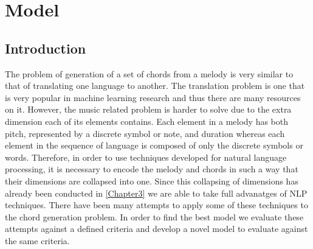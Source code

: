 
\chapter{Model} %

\label{Chapter4} %


\newcommand{\keyword}[1]{\textbf{#1}}
\newcommand{\tabhead}[1]{\textbf{#1}}
\newcommand{\code}[1]{\texttt{#1}}
\newcommand{\file}[1]{\texttt{\bfseries#1}}
\newcommand{\option}[1]{\texttt{\itshape#1}}



\section{Introduction}


The problem of generation of a set of chords from a melody is very similar to that of translating one language to another. 
The translation problem is one that is very popular in machine learning research and thus there are many resources on it.  
However, the music related problem is harder to solve due to the extra dimension each of its elements contains. 
Each element in a melody has both pitch, represented by a discrete symbol or note, and duration whereas each element in the sequence of language is composed of only the discrete symbols or words.  
Therefore, in order to use techniques developed for natural language processing, it is necessary to encode the melody and chords in such a way that their dimensions are collapsed into one. 
Since this collapsing of dimensions has already been conducted in \ref{Chapter3} we are able to take full advanatges of NLP techniques.
There have been many attempts to apply some of these techniques to the chord generation problem. 
In order to find the best model we evaluate these attempts against a defined criteria and develop a novel model to evaluate against the same criteria.


